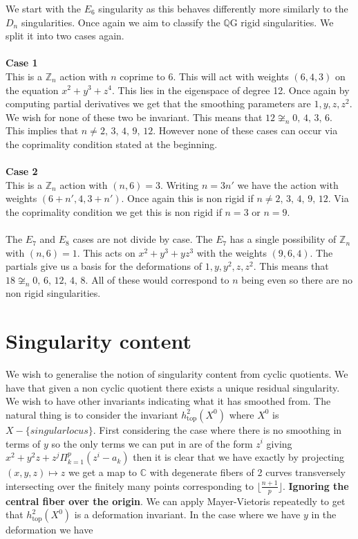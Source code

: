 \documentclass[11pt]{report}
\theoremstyle{definition}
\theoremstyle{definition}
\theoremstyle{definition}
\theoremstyle{definition}
\theoremstyle{definition}
\theoremstyle{definition}
\theoremstyle{definition}
\theoremstyle{definition}
\begin{document}
 We start with the $E_6$ singularity as this behaves differently more similarly to the $D_n$ singularities. Once again we aim to classify the $\mathbb{Q}$G rigid singularities. We split it into two cases again. 
 \\
 \\
 \textbf{Case 1}
 \\
 This is a $\mathbb{Z}_n$ action with $n$ coprime to 6. This will act with weights $(6,4,3)$ on the equation $x^2 + y^3 + z^4$. This lies in the eigenspace of degree 12. Once again by computing partial derivatives we get that the smoothing parameters are $1, y, z, z^2$. We wish for none of these two be invariant. This means that $12 \not\cong_n 0, \, 4, \, 3, \, 6$. This implies that $n \neq  2, \, 3, \, 4, \, 9, \, 12$. However none of these cases can occur via the coprimality condition stated at the beginning.
 \\
 \\
 \textbf{Case 2}
 \\
 This is a $\mathbb{Z}_n$ action with $(n, 6) = 3$. Writing $n = 3n'$ we have the action with weights $(6 + n', 4, 3 + n')$. Once again this is non rigid if $n \neq  2, \, 3, \, 4, \, 9, \, 12$. Via the coprimality condition we get this is non rigid if $n=3$ or $n=9$.
 \\
 \\
 The $E_7$ and $E_8$ cases are not divide by case. The $E_7$ has a single possibility of $\mathbb{Z}_n$ with $(n,6) = 1$. This acts on $x^2 + y^3 + yz^3$ with the weights $(9,6,4)$. The partials give us a basis for the deformations of $1, y, y^2, z, z^2$. This means that $18 \not\cong_n 0, \, 6, \, 12, \, 4, \, 8$. All of these would correspond to $n$ being even so there are no non rigid singularities. 
 
 
 \section{Singularity content}
 
 We wish to generalise the notion of singularity content from cyclic quotients. We have that given a non cyclic quotient there exists a unique residual singularity. We wish to have other invariants indicating what it has smoothed from. The natural thing is to consider the invariant $h^2_{\text{top}}(X^0)$ where $X^0$ is $X-\{singular locus\}$. First considering the case where there is no smoothing in terms of $y$ so the only terms we can put in are of the form $z^i$ giving $x^2 + y^2z +z^j \Pi_{k=1}^{p} (z^i - a_k)$ then it is clear that we have exactly by projecting $(x,y,z) \mapsto z$ we get a map to $\mathbb{C}$ with degenerate fibers of 2 curves transversely intersecting over the finitely many points corresponding to $\lfloor \frac{n+1}{p} \rfloor$. 
 \textbf{Ignoring the central fiber over the origin}. We can apply Mayer-Vietoris repeatedly to get that $h^2_{\text{top}}(X^0)$ is a deformation invariant. In the case where we have $y$ in the deformation we have 
 
\end{document}
